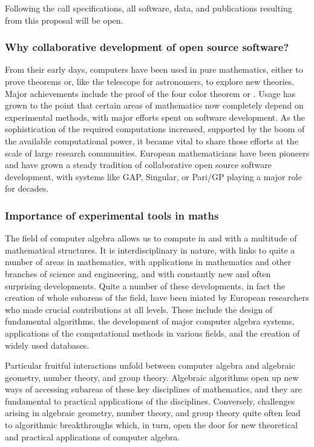 \documentclass[a4paper,11pt]{article}
\begin{document}
Following the call specifications, all software, data, and
publications resulting from this proposal will be open.

\subsubsection{Why collaborative development of open source software?}

From their early days, computers have been used in pure mathematics,
either to prove theorems or, like the telescope for astronomers, to
explore new theories. Major achievements include the proof of the four
color theorem or . Usage has grown to the
point that certain areas of mathematics now completely depend on
experimental methods, with major efforts spent on software
development. As the sophistication of the required computations
increased, supported by the boom of the available computational power,
it became vital to share those efforts at the scale of large research
communities. European mathematicians have been pioneers and have grown
a steady tradition of collaborative open source software development,
with systems like GAP, Singular, or Pari/GP playing a major role for
decades.

\subsubsection{Importance of experimental tools in maths}

The field of computer algebra allows us to compute in and with a multitude
of mathematical structures. It is interdisciplinary in nature, with links to quite
a number of areas in mathematics, with applications in mathematics and other
branches of science and engineering, and with constantly new and often
surprising developments. Quite a number of these developments, in fact the
creation of whole subareas of the field,  have been iniated by European
researchers who made crucial contributions at all levels. These include the
design of fundamental algorithms, the development of major computer
algebra systems, applications of the computational methods in various fields,
and the creation of widely used databases.

Particular fruitful interactions unfold between computer algebra and
algebraic geometry, number theory, and group theory. Algebraic algorithms
open up new ways of accessing subareas of these key disciplines of
mathematics, and they are fundamental to practical applications of the
disciplines. Conversely, challenges arising in algebraic geometry, number
theory, and group theory quite often lead to algorithmic breakthroughs
which, in turn, open the door for new theoretical and practical applications
of computer algebra.
\end{document}
